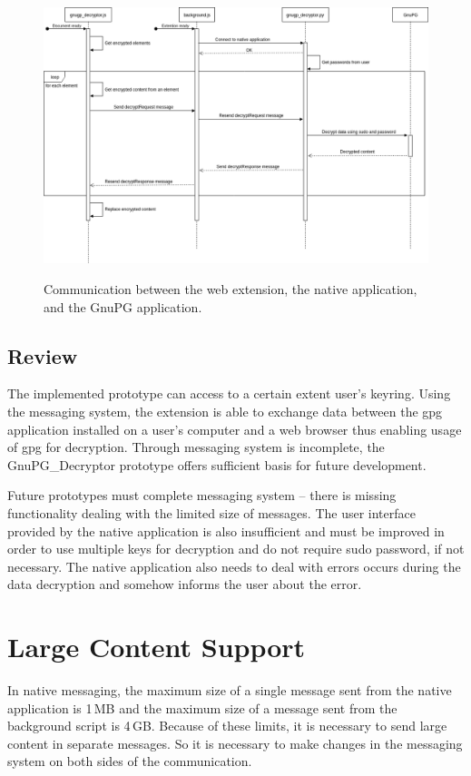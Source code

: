 \begin{figure}[H]
    \begin{center}
        \label{img:gnupg_decryptor-sequence}
        \includegraphics[width=1.3\textwidth,angle=90]{obrazky-figures/sequence-gnupg_decryptor.png}
        \caption{Communication between the web extension, the native application, and the GnuPG application.}
    \end{center}
\end{figure}

\subsection{Review}
The implemented prototype can access to a certain extent user's keyring. Using the messaging system, the extension is able to exchange data between the gpg application installed on a user's computer and a web browser thus enabling usage of gpg for decryption. Through messaging system is incomplete, the GnuPG\_Decryptor prototype offers sufficient basis for future development.

Future prototypes must complete messaging system -- there is missing functionality dealing with the limited size of messages. The user interface provided by the native application is also insufficient and must be improved in order to use multiple keys for decryption and do not require sudo password, if not necessary. The native application also needs to deal with errors occurs during the data decryption and somehow informs the user about the error.

\section{Large Content Support}
In native messaging, the maximum size of a single message sent from the native application is 1\,MB and the maximum size of a message sent from the background script is 4\,GB. Because of these limits, it is necessary to send large content in separate messages. So it is necessary to make changes in the messaging system on both sides of the communication.

